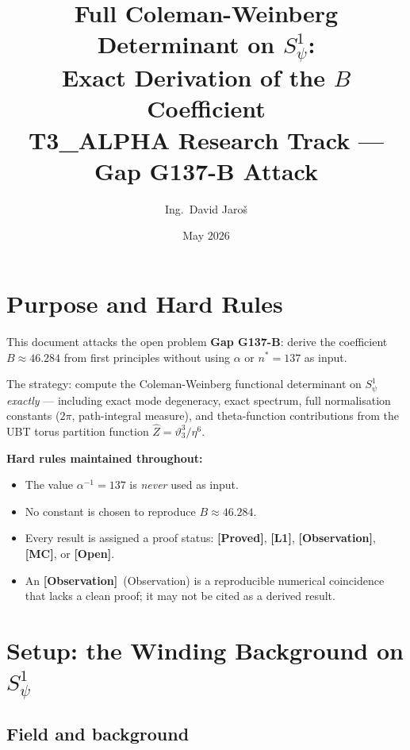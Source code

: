 \documentclass[12pt,a4paper]{article}
\title{\textbf{Full Coleman-Weinberg Determinant on $S^1_\psi$:\\
         Exact Derivation of the $B$ Coefficient}\\[4pt]
         \large T3\_ALPHA Research Track — Gap G137-B Attack}
\author{Ing.\ David Jaro\v{s}}
\date{May 2026}
\theoremstyle{definition}
\theoremstyle{remark}
\newcommand{\PROVED}{\textbf{[Proved]}}
\newcommand{\OPEN}{\textbf{[Open]}}
\newcommand{\OBS}{\textbf{[Observation]}}
\newcommand{\MC}{\textbf{[MC]}}
\newcommand{\Lone}{\textbf{[L1]}}
\begin{document}
  \maketitle
  \tableofcontents
  \newpage
\fi

\section{Purpose and Hard Rules}
\label{sec:cw:purpose}

This document attacks the open problem \textbf{Gap G137-B}: derive the
coefficient $B \approx 46.284$ from first principles without using $\alpha$ or
$n^* = 137$ as input.

The strategy: compute the Coleman-Weinberg functional determinant on $S^1_\psi$
\emph{exactly} — including exact mode degeneracy, exact spectrum, full
normalisation constants ($2\pi$, path-integral measure), and theta-function
contributions from the UBT torus partition function $\hat{Z} = \vartheta_3^3/\eta^6$.

\begin{warnbox}
\textbf{Hard rules maintained throughout:}
\begin{itemize}
  \item The value $\alpha^{-1} = 137$ is \emph{never} used as input.
  \item No constant is chosen to reproduce $B \approx 46.284$.
  \item Every result is assigned a proof status:
        \PROVED, \Lone, \OBS, \MC, or \OPEN.
  \item An \OBS\ (Observation) is a reproducible numerical coincidence
        that lacks a clean proof; it may not be cited as a derived result.
\end{itemize}
\end{warnbox}

\section{Setup: the Winding Background on $S^1_\psi$}
\label{sec:cw:setup}

\subsection{Field and background}
\end{document}
